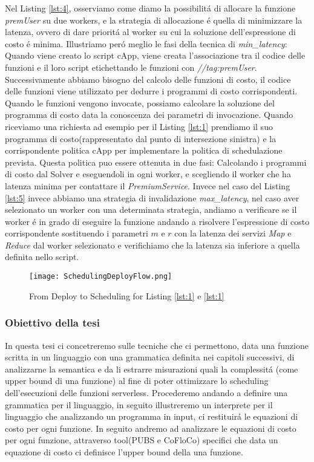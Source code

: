 \documentclass[../main.tex]{subfiles}
\begin{document}
Nel Listing \ref{lst:4}, osserviamo come diamo la possibilitá di allocare la funzione \textit{premUser} su due workers, e la strategia di allocazione é quella di minimizzare la latenza, ovvero di dare prioritá al worker su cui la soluzione dell'espressione di costo é minima.
Illustriamo peró meglio le fasi della tecnica di \textit{min\_latency}:
Quando viene creato lo script cApp, viene creata l'associazione tra il codice delle funzioni e il loro script etichettando le funzioni con \textit{//tag:premUser}.
Successivamente abbiamo bisogno del calcolo delle funzioni di costo, il codice delle funzioni viene utilizzato per dedurre i programmi di costo corrispondenti.
Quando le funzioni vengono invocate, possiamo calcolare la soluzione del programma di costo data la conoscenza dei parametri di invocazione.
Quando riceviamo una richiesta ad esempio per il Listing \ref{lst:1} prendiamo il suo programma di costo(rappresentato dal punto di intersezione sinistra) e la corrispondente politica cApp per implementare la politica di schedulazione prevista.
Questa politica puo essere ottenuta in due fasi: Calcolando i programmi di costo dal Solver e eseguendoli in ogni worker, e scegliendo il worker che ha latenza minima per contattare il \textit{PremiumService}.
Invece nel caso del Listing \ref{lst:5} invece abbiamo una strategia di invalidazione \textit{max\_latency}, nel caso aver selezionato un worker con una determinata strategia, andiamo a verificare se il worker é in grado di eseguire la funzione andando a risolvere l'espressione di costo corrispondente sostituendo i parametri $m$ e $r$ con la latenza dei servizi \textit{Map} e \textit{Reduce} dal worker selezionato e verifichiamo che la latenza sia inferiore a quella definita nello script.\autocite{deserverless}\\
\begin{figure}[H]
    \texttt{[image: SchedulingDeployFlow.png]}
    \centering
    \caption{From Deploy to Scheduling for Listing \ref{lst:1} e \ref{lst:1} }
\end{figure}

\subsubsection{Obiettivo della tesi}

In questa tesi ci concetreremo sulle tecniche che ci permettono, data una funzione scritta in un linguaggio con una grammatica definita nei capitoli successivi, di analizzarne la semantica e da li estrarre misurazioni quali la complessitá (come upper bound di una funzione) al fine di poter ottimizzare lo scheduling dell'esecuzioni delle funzioni serverless.
Procederemo andando a definire una grammatica per il linguaggio, in seguito illustreremo un interprete per il linguaggio che analizzando un programma in input, ci restituirá le equazioni di costo per ogni funzione.
In seguito andremo ad analizzare le equazioni di costo per ogni funzione, attraverso tool(PUBS \autocite{albert2008automatic} e CoFloCo\autocite{flores2014resource}) specifici che data un equazione di costo ci definisce l'upper bound della una funzione.
\end{document}
